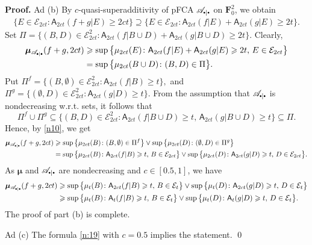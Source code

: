 \documentclass[preprint,11pt]{elsarticle}
\theoremstyle{definition}
\renewenvironment{proof}[1][\textbf{Proof}]{\noindent\textbf{#1.} }{\hfill\qed\vspace{2.5ex}}
\newcommand\bF{\mathbf{F}} %
\newcommand\bFs{\bF_0^2} %
\newcommand\cE{{\mathcal E}}
\newcommand\sA{\mathsf{A}}
\newcommand\aAd[3][E]{\sA_{#3}(#2|#1)}%
\newcommand\sbullet[1][.5]{\mathbin{\vcenter{\hbox{\scalebox{#1}{$\bullet$}}}}}
\newcommand\bpeA{\mathscr {A}_{\sbullet|\sbullet}}%
\newcommand\bE{{\mathscr {E}}}
\newcommand{\bmu}{\boldsymbol{\mu}}
\newcommand\bmub[1][\bpeA]{\bmu_{#1}}
\renewcommand\ge{\geqslant}
\begin{document}
\begin{proof}
Ad (b)
By $c$-quasi-superadditivity  of pFCA $\bpeA$ on $\bFs$, we obtain
\begin{align*}
    \{E\in\cE_{2ct} \colon \aAd{f+g}{2ct} \ge 2c t\}\supseteq \{E\in\cE_{2ct} \colon \aAd{f}{2ct}+\aAd{g}{2ct} \ge 2t\}.
\end{align*}
Set $\Pi=\{(B,D)\in \cE_{2ct}^2 \colon \aAd[B\cup D]{f}{2ct}+\aAd[B\cup D]{g}{2ct}\ge 2t\}.$ Clearly,
\begin{align}\label{n10}
    \bmub(f+g,2ct)&\ge \sup\big\{\mu_{2ct}(E)\colon \aAd{f}{2ct}+\aAd{g}{2ct}\ge 2t,\, E\in \cE_{2ct}\big\}\notag
    \\&=\sup\big\{\mu_{2ct}(B\cup D)\colon (B,D)\in \Pi\big\}.
\end{align}
Put
$\Pi^f=\{(B,\emptyset)\in\cE_{2ct}^2\colon \aAd[B]{f}{2ct}\ge t\},$ and  $\Pi^g=\{(\emptyset,D)\in \cE_{2ct}^2 \colon \aAd[D]{g}{2ct}\ge t\}.$ From the assumption that $\bpeA$ is nondecreasing w.r.t. sets, it follows that
$$
\Pi^f\cup \Pi^g\subseteq \{(B,D)\in \cE^2_{2ct}\colon \aAd[B\cup D]{f}{2ct}\ge t,\, \aAd[B\cup D]{g}{2ct}\ge t\}\subseteq \Pi.
$$
Hence, by \eqref{n10}, we get
\begin{align}
    \bmub(f+g,2ct)&\ge
    \sup\big\{\mu_{2ct}(B)\colon (B,\emptyset)\in \Pi^f\big\} \vee \sup\big\{\mu_{2ct}(D)\colon (\emptyset,D)\in \Pi^g\big\}\notag
    \\
    & = \sup\big\{\mu_{2ct}(B)\colon \sA_{2ct}(f|B)\ge  t,\,B\in \cE_{2ct}\big\} \vee \sup\big\{\mu_{2ct}(D)\colon \sA_{2ct}(g|D)\ge t,\,D\in \cE_{2ct}\big\}.\label{n:19}
\end{align}
As $\bmu$ and $\bpeA$ are nondecreasing and $c\in [0.5,1]$, we have
\begin{align*}
\bmub(f+g,2ct)&\ge \sup\big\{ \mu_{t}(B)\colon \aAd[B]{f}{2ct}\ge t,\, B\in\cE_{t}\big\}\vee\sup\big\{ \mu_t(D)\colon   \aAd[D]{g}{2ct}\ge t,\,D\in\cE_{t}\big\}
\\&\ge \sup\big\{ \mu_t(B)\colon \aAd[B]{f}{t}\ge t,\, B\in\cE_{t}\big\}\vee\sup\big\{ \mu_t(D)\colon   \aAd[D]{g}{t}\ge t,\,D\in\cE_{t}\big\}.
\end{align*}
The proof of part  (b) is complete.

Ad (c)  %
The formula \eqref{n:19} with $c=0.5$ implies the statement.
\end{proof}
\end{document}
